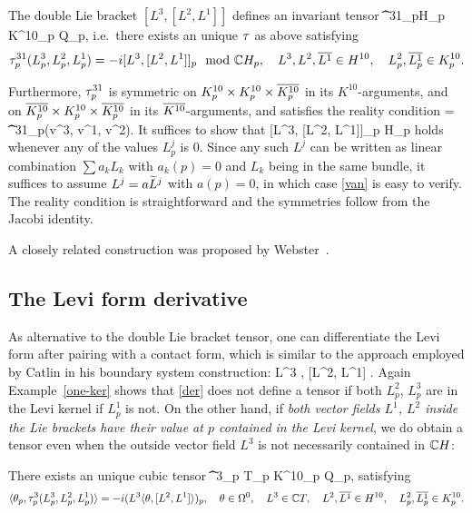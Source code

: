 \documentclass[12pt]{amsart}
\begin{document}
\bl{}
	The double Lie bracket $[L^3, [L^2, L^1]]$ defines
	an invariant tensor
	\beq
		\t^{31}_p\colon \C H_p \times K^{10}_p \times {} \to \C Q_p,
	\eeq
	i.e.\ there exists an unique $\tau$ as above satisfying
	$$
		\tau^{31}_p(L^3_p, L^2_p, L^1_p) 
		= -i  [L^3, [L^2, L^1]]_p \mod {{\mathbb{C}}} H_p
		,
		\quad L^3, L^2, \overline{L^1} \in H^{10},
		\quad L^2_p, \overline{L^1_p}\in K^{10}_p.
	$$
	
	Furthermore, $\tau^{31}_p$ is symmetric on $K^{10}_p\times K^{10}_p\times \overline{K^{10}_p}$ 
	in its $K^{10}$-arguments, 
	and on $\overline{K^{10}_p}\times K^{10}_p\times \overline{K^{10}_p}$ in its $\overline{K^{10}}$-arguments,  
	and satisfies the reality condition
\beq{}
	 = \t^{31}_p(\1v^3, \1v^1, \1v^2).
\eeq
\el
\bpf
It suffices to show that
\beq{}
	[L^3, [L^2, L^1]]_p \in \C H_p
\eeq
holds
whenever any of the values $L^j_p$ is $0$.
Since any such $L^j$ can be written as linear combination
$\sum a_k L_k$ with $a_k(p)=0$ and $L_k$ being in the same bundle,
it suffices to assume $L^j = a \widetilde{L}^j$ with $a(p)=0$,
in which case \eqref{van} is easy to verify.
The reality condition is straightforward and the symmetries follow
from the Jacobi identity.
\epf

A closely related construction 
was proposed by Webster~\cite{W}.


\subsection{The Levi form derivative}
As alternative to the double Lie bracket tensor, one can 
differentiate the Levi form after pairing with a contact form,
which is similar to the approach employed by Catlin 
in his boundary system construction:
\beq{}
	L^3 \la \th, [L^2, L^1] \ra.
\eeq
Again Example~\ref{one-ker} shows that \eqref{der}
does not define a tensor if both $L^2_p$, $L^3_p$
are in the Levi kernel if $L^1_p$ is not.
On the other hand, if {\em both vector fields
$L^1$, $L^2$ inside the Lie brackets
have their value at $p$ contained in the Levi kernel}, we do obtain a tensor
even when the outside vector field $L^3$ is not necessarily contained in ${\mathbb{C}} H$:

\bl{}
There exists an unique cubic tensor
\beq
	\t^3_p \colon \C T_p \times  K^{10}_p \times {} \to \C Q_p,
\eeq
satisfying
	$$
		\langle \theta_p, \tau^3_p(L^3_p, L^2_p, L^1_p) \rangle
		= -i (L^3\langle \theta, [L^2, L^1] \rangle)_p
		,
		\quad \theta\in \Omega^0,
		\quad L^3 \in {\mathbb{C}} T,
		\quad L^2, \overline{L^1} \in H^{10},
		\quad L^2_p, \overline{L^1_p}\in K^{10}_p.
	$$
\end{document}
